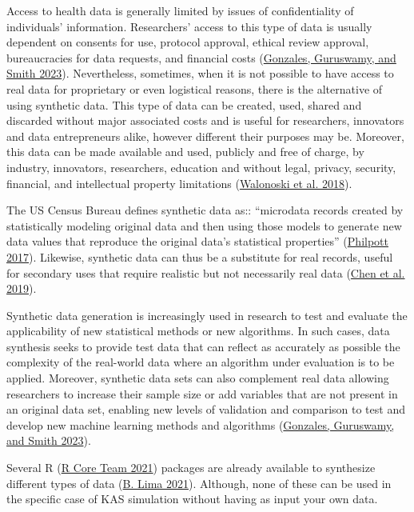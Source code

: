 \documentclass[
]{article}
\begin{document}
Access to health data is generally limited by issues of confidentiality
of individuals' information. Researchers' access to this type of data is
usually dependent on consents for use, protocol approval, ethical review
approval, bureaucracies for data requests, and financial costs
(\protect\hyperlink{ref-Gonzales:2023}{Gonzales, Guruswamy, and Smith
2023}). Nevertheless, sometimes, when it is not possible to have access
to real data for proprietary or even logistical reasons, there is the
alternative of using synthetic data. This type of data can be created,
used, shared and discarded without major associated costs and is useful
for researchers, innovators and data entrepreneurs alike, however
different their purposes may be. Moreover, this data can be made
available and used, publicly and free of charge, by industry,
innovators, researchers, education and without legal, privacy, security,
financial, and intellectual property limitations
(\protect\hyperlink{ref-Walonoski:2018}{Walonoski et al. 2018}).

The US Census Bureau defines synthetic data as:: ``microdata records
created by statistically modeling original data and then using those
models to generate new data values that reproduce the original data's
statistical properties'' (\protect\hyperlink{ref-Philpott:2017}{Philpott
2017}). Likewise, synthetic data can thus be a substitute for real
records, useful for secondary uses that require realistic but not
necessarily real data (\protect\hyperlink{ref-Chen:2019}{Chen et al.
2019}).

Synthetic data generation is increasingly used in research to test and
evaluate the applicability of new statistical methods or new algorithms.
In such cases, data synthesis seeks to provide test data that can
reflect as accurately as possible the complexity of the real-world data
where an algorithm under evaluation is to be applied. Moreover,
synthetic data sets can also complement real data allowing researchers
to increase their sample size or add variables that are not present in
an original data set, enabling new levels of validation and comparison
to test and develop new machine learning methods and algorithms
(\protect\hyperlink{ref-Gonzales:2023}{Gonzales, Guruswamy, and Smith
2023}).

Several R (\protect\hyperlink{ref-R}{R Core Team 2021}) packages are
already available to synthesize different types of data
(\protect\hyperlink{ref-ctv:2021}{B. Lima 2021}). Although, none of
these can be used in the specific case of KAS simulation without having
as input your own data.
\end{document}
